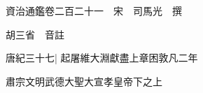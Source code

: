 






























































資治通鑑卷二百二十一　宋　司馬光　撰

胡三省　音註

唐紀三十七|{
	起屠維大淵獻盡上章困敦凡二年}


肅宗文明武德大聖大宣孝皇帝下之上

